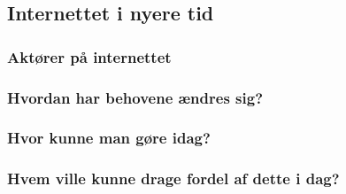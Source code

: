 \subsection{Internettet i nyere tid}

\subsubsection{Aktører på internettet}

\subsubsection{Hvordan har behovene ændres sig?}

\subsubsection{Hvor kunne man gøre idag?}

\subsubsection{Hvem ville kunne drage fordel af dette i dag?}
